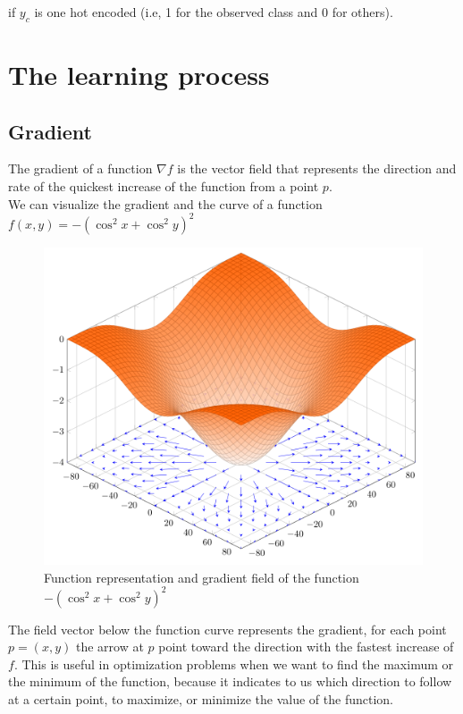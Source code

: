 \documentclass[a4paper, twocolumn, twoside]{article}
\begin{document}
	if $y_{c}$ is one hot encoded (i.e, 1 for the observed class and 0 for others).

	\section{The learning process}
	\subsection{Gradient}
	The gradient of a function $\nabla f$ is the vector field that represents the direction
	and rate of the quickest increase of the function from a point $p$.\\
	We can visualize the gradient and the curve of a function $f(x, y) = -(\cos^2 x  +\cos^2 y)^2$\\

	\begin{figure}[H]
		\begin{center}
			\includegraphics[width=\columnwidth]{images/gradient_2d.png}
		\end{center}
		\caption{Function representation and gradient field of the function $-(\cos^2 x  +\cos^2 y)^2$}\label{fig:gradien2d}
	\end{figure}

	The field vector below the function curve represents the gradient,
	for each point $p = (x, y)$ the arrow at $p$ point toward the direction
	with the fastest increase of $f$.
        This is useful in optimization problems when we want to find the maximum or the minimum
        of the function, because it indicates to us which direction to follow at a certain point,
        to maximize, or minimize the value of the function.
\end{document}
